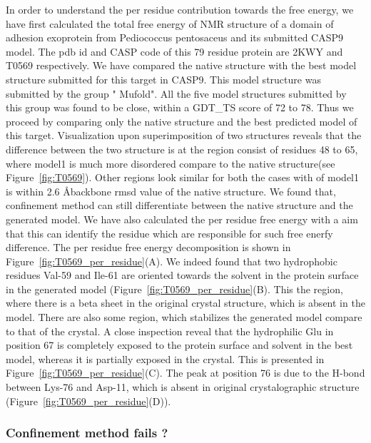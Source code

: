 \documentclass[12pt]{article}
\begin{document}
In order to understand the per residue contribution towards the free energy, we have first calculated the total free energy of NMR 
structure of a domain of adhesion exoprotein from Pediococcus pentosaceus and its submitted CASP9 model. The 
pdb id and CASP code of this 79 residue protein are 2KWY and T0569 respectively. We have compared the native structure with the
best model structure submitted for this target in CASP9. This model structure was submitted by the group " Mufold". All the
five model structures submitted by this group was found to be close, within a GDT\_TS score  of 72 to 78. Thus we proceed by 
comparing only the native structure and
the best predicted model of this target. Visualization upon superimposition of two structures reveals that
the difference between the two structure is at the region consist of residues 48 to 65, where model1 is much more disordered compare to the
native structure(see Figure~\ref{fig:T0569}). Other regions look similar for both the cases with of model1 is within 2.6 \AA backbone
rmsd value of the native structure. We found that, confinement method can still differentiate between the native structure and 
the generated model. We have also calculated the per residue free energy with a aim that this can identify the residue which are responsible
for such free enerfy difference. The per residue free energy decomposition is shown in  Figure~\ref{fig:T0569_per_residue}(A). We indeed 
found that two hydrophobic residues Val-59 and Ile-61 are oriented towards the solvent in the protein 
surface in the generated model (Figure~\ref{fig:T0569_per_residue}(B). This the region, where there is a beta sheet in the original crystal structure, which is absent in the 
model. There are also some region, which stabilizes the generated model compare to that of the crystal. A close inspection reveal that 
the hydrophilic Glu in position 67 is completely exposed to the protein surface and solvent in the best model, whereas it is partially exposed in the 
crystal. This is presented in Figure~\ref{fig:T0569_per_residue}(C). The peak at position 76 is due to the H-bond between Lys-76 and Asp-11, 
which is absent in original crystalographic structure (Figure~\ref{fig:T0569_per_residue}(D)). 
   
\subsubsection{Confinement method fails ?}
\end{document}
